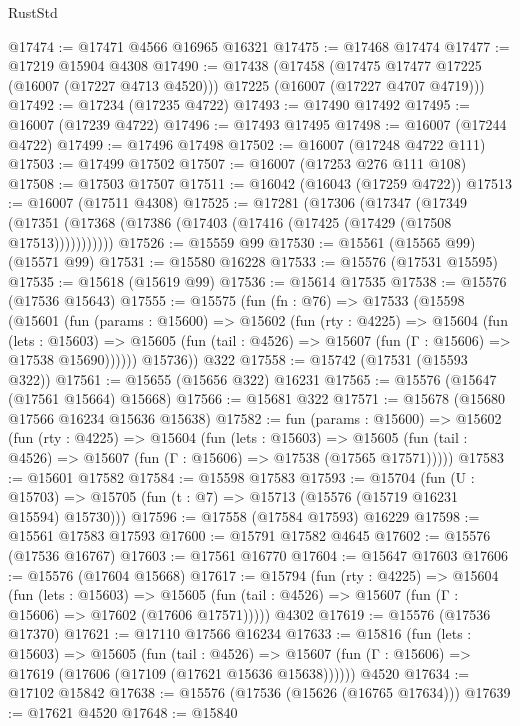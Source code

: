 \begin{lexlean}{RustStd}
\begin{coremodule}
@17474 := @17471 @4566 @16965 @16321
@17475 := @17468 @17474
@17477 := @17219 @15904 @4308
@17490 := @17438
    (@17458
      (@17475 @17477 @17225 (@16007 (@17227 @4713 @4520)))
      @17225
      (@16007 (@17227 @4707 @4719)))
@17492 := @17234 (@17235 @4722)
@17493 := @17490 @17492
@17495 := @16007 (@17239 @4722)
@17496 := @17493 @17495
@17498 := @16007 (@17244 @4722)
@17499 := @17496 @17498
@17502 := @16007 (@17248 @4722 @111)
@17503 := @17499 @17502
@17507 := @16007 (@17253 @276 @111 @108)
@17508 := @17503 @17507
@17511 := @16042 (@16043 (@17259 @4722))
@17513 := @16007 (@17511 @4308)
@17525 := @17281
    (@17306
      (@17347
        (@17349 (@17351 (@17368 (@17386 (@17403 (@17416 (@17425 (@17429 (@17508 @17513)))))))))))
@17526 := @15559 @99
@17530 := @15561 (@15565 @99) (@15571 @99)
@17531 := @15580 @16228
@17533 := @15576 (@17531 @15595)
@17535 := @15618 (@15619 @99)
@17536 := @15614 @17535
@17538 := @15576 (@17536 @15643)
@17555 := @15575
    (fun (fn : @76) =>
    @17533
      (@15598
        (@15601
          (fun (params : @15600) =>
          @15602
            (fun (rty : @4225) =>
            @15604
              (fun (lets : @15603) =>
              @15605 (fun (tail : @4526) => @15607 (fun (Γ : @15606) => @17538 @15690))))))
        @15736))
    @322
@17558 := @15742 (@17531 (@15593 @322))
@17561 := @15655 (@15656 @322) @16231
@17565 := @15576 (@15647 (@17561 @15664) @15668)
@17566 := @15681 @322
@17571 := @15678 (@15680 @17566 @16234 @15636 @15638)
@17582 := fun (params : @15600) =>
  @15602
    (fun (rty : @4225) =>
    @15604
      (fun (lets : @15603) =>
      @15605 (fun (tail : @4526) => @15607 (fun (Γ : @15606) => @17538 (@17565 @17571)))))
@17583 := @15601 @17582
@17584 := @15598 @17583
@17593 := @15704
    (fun (U : @15703) => @15705 (fun (t : @7) => @15713 (@15576 (@15719 @16231 @15594) @15730)))
@17596 := @17558 (@17584 @17593) @16229
@17598 := @15561 @17583 @17593
@17600 := @15791 @17582 @4645
@17602 := @15576 (@17536 @16767)
@17603 := @17561 @16770
@17604 := @15647 @17603
@17606 := @15576 (@17604 @15668)
@17617 := @15794
    (fun (rty : @4225) =>
    @15604
      (fun (lets : @15603) =>
      @15605 (fun (tail : @4526) => @15607 (fun (Γ : @15606) => @17602 (@17606 @17571)))))
    @4302
@17619 := @15576 (@17536 @17370)
@17621 := @17110 @17566 @16234
@17633 := @15816
    (fun (lets : @15603) =>
    @15605
      (fun (tail : @4526) =>
      @15607 (fun (Γ : @15606) => @17619 (@17606 (@17109 (@17621 @15636 @15638))))))
    @4520
@17634 := @17102 @15842
@17638 := @15576 (@17536 (@15626 (@16765 @17634)))
@17639 := @17621 @4520
@17648 := @15840

\end{coremodule}
\end{lexlean}
